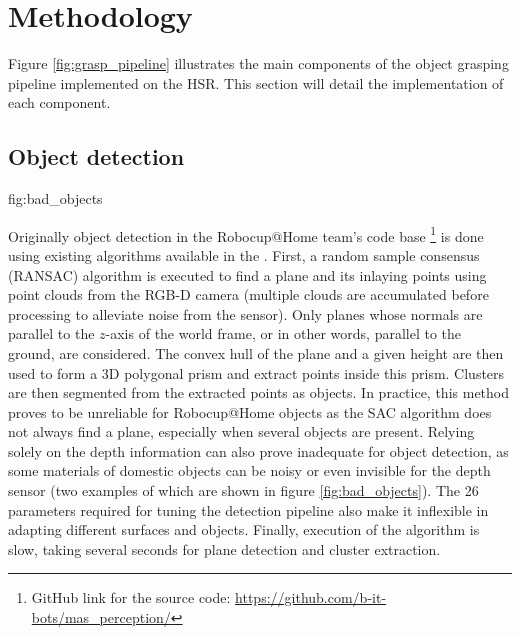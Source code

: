 \chapter{Methodology}


Figure \ref{fig:grasp_pipeline} illustrates the main components of the object grasping pipeline implemented on the HSR.
This section will detail the implementation of each component.


\section{Object detection}
             {fig:bad_objects}{\textwidth}

Originally object detection in the Robocup@Home team's code base \footnote{GitHub link for the source code:
\url{https://github.com/b-it-bots/mas\_perception/}} is done using existing algorithms available in the
. First, a random sample consensus (RANSAC)
algorithm is executed to find a plane and its inlaying points using point clouds from the RGB-D camera (multiple clouds
are accumulated before processing to alleviate noise from the sensor). Only planes whose normals are parallel to the
$ z $-axis of the world frame, or in other words, parallel to the ground, are considered. The convex hull of the plane
and a given height are then used to form a 3D polygonal prism and extract points inside this prism. Clusters are then
segmented from the extracted points as objects. In practice, this method proves to be unreliable for Robocup@Home
objects as the SAC algorithm does not always find a plane, especially when several objects are present. Relying solely
on the depth information can also prove inadequate for object detection, as some materials of domestic objects can be
noisy or even invisible for the depth sensor (two examples of which are shown in figure \ref{fig:bad_objects}). The 26
parameters required for tuning the detection pipeline also make it inflexible in adapting different surfaces and
objects. Finally, execution of the algorithm is slow, taking several seconds for plane detection and cluster
extraction.

